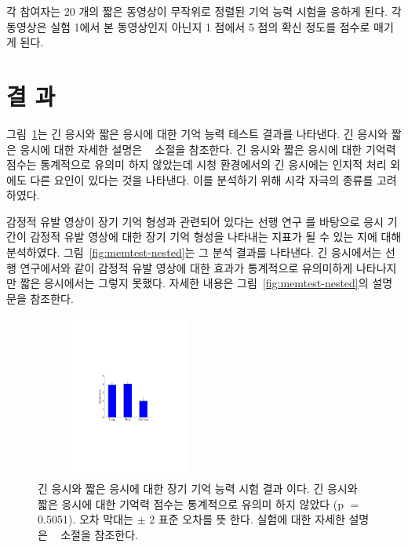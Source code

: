 \documentclass{kcc}
\begin{document}
각 참여자는 20 개의 짧은 동영상이 무작위로 정렬된 기억 능력 시험을 응하게 된다. 각 동영상은 실험 1에서 본 동영상인지 아닌지 1 점에서 5 점의 확신 정도를 점수로 매기게 된다. 


\section{결 과}
그림~\ref{fig:memtest-leng}는 긴 응시와 짧은 응시에 대한 기억 능력 테스트 결과를 나타낸다. 긴 응시와 짧은 응시에 대한 자세한 설명은 ~ 소절을 참조한다. 긴 응시와 짧은 응시에 대한 기억력 점수는 통계적으로 유의미 하지 않았는데 시청 환경에서의 긴 응시에는 인지적 처리 외에도 다른 요인이 있다는 것을 나타낸다. 이를 분석하기 위해 시각 자극의 종류를 고려하였다.

감정적 유발 영상이 장기 기억 형성과 관련되어 있다는 선행 연구 \cite{Cahill1996amyg,Cahill1998baso}를 바탕으로 응시 기간이 감정적 유발 영상에 대한 장기 기억 형성을 나타내는 지표가 될 수 있는 지에 대해 분석하였다. 그림~\ref{fig:memtest-nested}는 그 분석 결과를 나타낸다. 긴 응시에서는 선행 연구에서와 같이 감정적 유발 영상에 대한 효과가 통계적으로 유의미하게 나타나지만 짧은 응시에서는 그렇지 못했다. 자세한 내용은 그림~\ref{fig:memtest-nested}의 설명문을 참조한다.

\begin{figure}
  \centerline{\includegraphics[width=60mm,height=54mm,trim=65mm 103mm 68mm 100mm]{./eps/memtest_leng}}
  \caption{긴 응시와 짧은 응시에 대한 장기 기억 능력 시험 결과 이다. 긴 응시와 짧은 응시에 대한 기억력 점수는 통계적으로 유의미 하지 않았다 (p $=$ 0.5051). 오차 막대는 $\pm$ 2 표준 오차를 뜻 한다. 실험에 대한 자세한 설명은 ~ 소절을 참조한다.}
  \label{fig:memtest-leng}
\end{figure}
\end{document}

